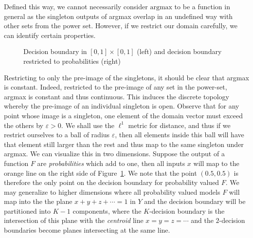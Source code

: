 Defined this way, we cannot necessarily consider $\text{argmax}$ to be a function in general as the singleton outputs of argmax overlap in an undefined way with other sets from the power set. However, if we restrict our domain carefully, we can identify certain properties. 
\begin{figure}[!ht]
\begin{center}

\caption{Decision boundary in $[0,1] \times [0,1]$ (left) and decision boundary restricted to probabilities (right) }
\label{fig:pdb}
\end{center}
\end{figure}
Restricting to only the pre-image of the singletons, it should be
clear that argmax is constant.  Indeed, restricted to the pre-image of
any set in the power-set, argmax is constant and thus
continuous. This induces the discrete topology whereby the pre-image
of an individual singleton is open. Observe that for any point whose
image is a singleton, one element of the domain vector must exceed the 
others by $\varepsilon > 0$. We shall use the $\ell^1$ metric for
distance, and thus if we restrict ourselves to a ball of radius
$\varepsilon$, then all elements inside this ball will have that
element still larger than the rest and thus map to the same singleton
under argmax. We can visualize this in two dimensions. Suppose the output of a function $F$ are \emph{probabilities} which add to one, then all inputs $x$ will map to the orange line on the right side of Figure~\ref{fig:pdb}. We note that the point $(0.5, 0.5)$ is therefore the only point on the decision boundary for probability valued $F$. We may generalize to higher dimensions where all probability valued models $F$ will map into the the plane $x + y + z + \cdots = 1$ in $Y$ and the decision boundary will be partitioned into $K-1$ components, where the $K$-decision boundary is the intersection of this plane with the \emph{centroid} line $x = y = z = \cdots$ and the $2$-decision boundaries become planes intersecting at the same line.

